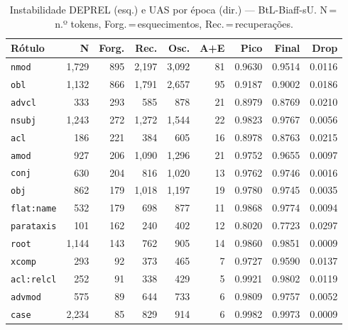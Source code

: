 

\begin{table}[ht]
\centering
\caption{Instabilidade DEPREL (esq.) e UAS por época (dir.) --- BtL-Biaff-sU. N\,=\,n.º tokens, Forg.\,=\,esquecimentos, Rec.\,=\,recuperações.}
\label{tab:inst-bert-large-portuguese-cased-predictions-ablacao-biaffine}
\begin{minipage}[t]{0.54\linewidth}
\centering\tiny
\begin{tabular}{lrrrrrrrr}
\toprule
\textbf{Rótulo} & \textbf{N} & \textbf{Forg.} & \textbf{Rec.} & \textbf{Osc.} & \textbf{A+E} & \textbf{Pico} & \textbf{Final} & \textbf{Drop} \\
\midrule
\texttt{nmod} & 1,729 & 895 & 2,197 & 3,092 & 81 & 0.9630 & 0.9514 & 0.0116 \\
\texttt{obl} & 1,132 & 866 & 1,791 & 2,657 & 95 & 0.9187 & 0.9002 & 0.0186 \\
\texttt{advcl} & 333 & 293 & 585 & 878 & 21 & 0.8979 & 0.8769 & 0.0210 \\
\texttt{nsubj} & 1,243 & 272 & 1,272 & 1,544 & 22 & 0.9823 & 0.9767 & 0.0056 \\
\texttt{acl} & 186 & 221 & 384 & 605 & 16 & 0.8978 & 0.8763 & 0.0215 \\
\texttt{amod} & 927 & 206 & 1,090 & 1,296 & 21 & 0.9752 & 0.9655 & 0.0097 \\
\texttt{conj} & 630 & 204 & 816 & 1,020 & 13 & 0.9762 & 0.9746 & 0.0016 \\
\texttt{obj} & 862 & 179 & 1,018 & 1,197 & 19 & 0.9780 & 0.9745 & 0.0035 \\
\texttt{flat\!:\!name} & 532 & 179 & 698 & 877 & 11 & 0.9868 & 0.9774 & 0.0094 \\
\texttt{parataxis} & 101 & 162 & 240 & 402 & 12 & 0.8020 & 0.7723 & 0.0297 \\
\texttt{root} & 1,144 & 143 & 762 & 905 & 14 & 0.9860 & 0.9851 & 0.0009 \\
\texttt{xcomp} & 293 & 92 & 373 & 465 & 7 & 0.9727 & 0.9590 & 0.0137 \\
\texttt{acl\!:\!relcl} & 252 & 91 & 338 & 429 & 5 & 0.9921 & 0.9802 & 0.0119 \\
\texttt{advmod} & 575 & 89 & 644 & 733 & 6 & 0.9809 & 0.9757 & 0.0052 \\
\texttt{case} & 2,234 & 85 & 829 & 914 & 6 & 0.9982 & 0.9973 & 0.0009 \\
\bottomrule
\end{tabular}
\end{minipage}

\end{table}
